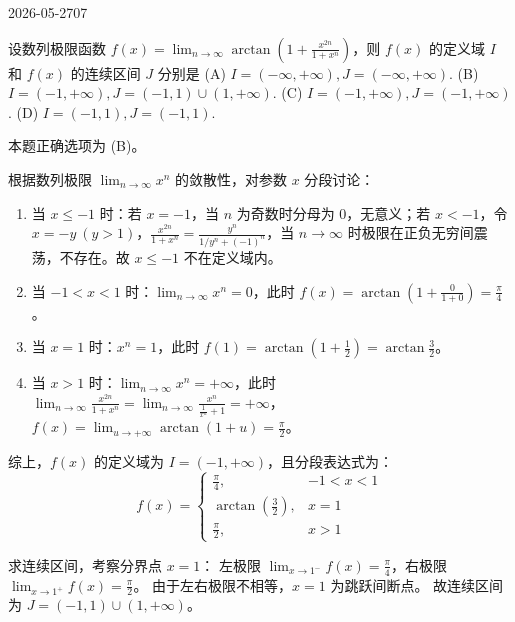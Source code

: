 \begin{mistake}{2026-05-27}{07}

\begin{problemcontent}
设数列极限函数 \(f(x) = \lim_{n \to \infty} \arctan\left(1 + \frac{x^{2n}}{1+x^n}\right)\)，则 \(f(x)\) 的定义域 \(I\) 和 \(f(x)\) 的连续区间 \(J\) 分别是
(A) \(I = (-\infty, +\infty), J = (-\infty, +\infty)\).
(B) \(I = (-1, +\infty), J = (-1, 1) \cup (1, +\infty)\).
(C) \(I = (-1, +\infty), J = (-1, +\infty)\).
(D) \(I = (-1, 1), J = (-1, 1)\).
\end{problemcontent}

\begin{solutioncontent}
本题正确选项为 (B)。

根据数列极限 \(\lim_{n \to \infty} x^n\) 的敛散性，对参数 \(x\) 分段讨论：

\begin{enumerate}
    \item 当 \(x \le -1\) 时：若 \(x = -1\)，当 \(n\) 为奇数时分母为 \(0\)，无意义；若 \(x < -1\)，令 \(x = -y \ (y > 1)\)，\(\frac{x^{2n}}{1+x^n} = \frac{y^n}{1/y^n + (-1)^n}\)，当 \(n \to \infty\) 时极限在正负无穷间震荡，不存在。故 \(x \le -1\) 不在定义域内。
    \item 当 \(-1 < x < 1\) 时：\(\lim_{n \to \infty} x^n = 0\)，此时 \(f(x) = \arctan\left(1 + \frac{0}{1+0}\right) = \frac{\pi}{4}\)。
    \item 当 \(x = 1\) 时：\(x^n = 1\)，此时 \(f(1) = \arctan\left(1 + \frac{1}{2}\right) = \arctan\frac{3}{2}\)。
    \item 当 \(x > 1\) 时：\(\lim_{n \to \infty} x^n = +\infty\)，此时 \(\lim_{n \to \infty} \frac{x^{2n}}{1+x^n} = \lim_{n \to \infty} \frac{x^n}{\frac{1}{x^n} + 1} = +\infty\)，\(f(x) = \lim_{u \to +\infty} \arctan(1 + u) = \frac{\pi}{2}\)。
\end{enumerate}

综上，\(f(x)\) 的定义域为 \(I = (-1, +\infty)\)，且分段表达式为：
\[
f(x) = \begin{cases}
\frac{\pi}{4}, & -1 < x < 1 \\
\arctan\left(\frac{3}{2}\right), & x = 1 \\
\frac{\pi}{2}, & x > 1
\end{cases}
\]

求连续区间，考察分界点 \(x = 1\)：
左极限 \(\lim_{x \to 1^-} f(x) = \frac{\pi}{4}\)，右极限 \(\lim_{x \to 1^+} f(x) = \frac{\pi}{2}\)。
由于左右极限不相等，\(x=1\) 为跳跃间断点。
故连续区间为 \(J = (-1, 1) \cup (1, +\infty)\)。
\end{solutioncontent}


\end{mistake}
